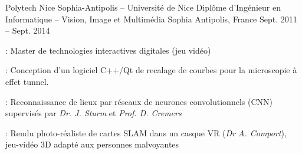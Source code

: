 \begin{cventries}
  \cventry
  {Polytech Nice Sophia-Antipolis -- Université de Nice} %
  {Diplôme d'Ingénieur en Informatique -- Vision, Image et Multimédia} %
  {Sophia Antipolis, France} %
  {Sept. 2011 -- Sept. 2014} %
  {
    \begin{cvitems} %
    \item {} : Master de technologies
      interactives digitales (jeu vidéo)
    \item {}: Conception d'un logiciel
      C++/Qt de recalage de courbes pour la microscopie à effet tunnel.
    \item {} :
      Reconnaissance de lieux par réseaux de neurones convolutionnels (CNN) supervisés par \emph{Dr. J.
      Sturm} et \emph{Prof. D. Cremers}
    \item {}: Rendu photo-réaliste de cartes SLAM dans un casque VR (\emph{Dr A.
      Comport}), jeu-vidéo 3D adapté aux personnes malvoyantes
    \end{cvitems}
  }

\end{cventries}
